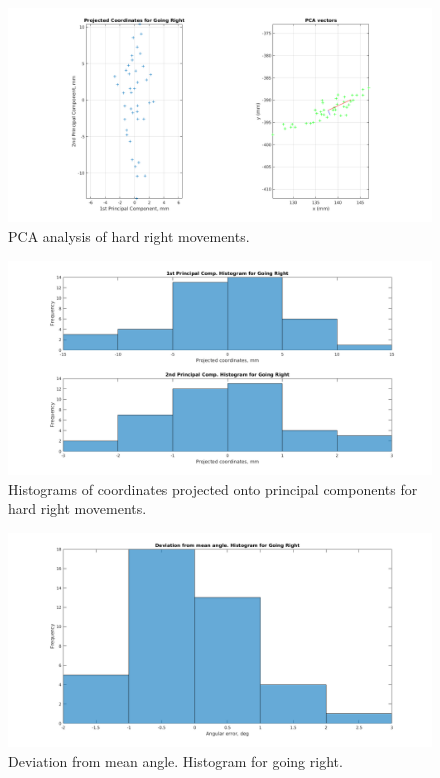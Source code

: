 \documentclass[paper=a4, fontsize=11pt]{scrartcl} %
\begin{document}
    \begin{figure}[H]
        \begin{center}
            \setlength{\fboxsep}{0.5pt} %
            \setlength{\fboxrule}{0.5pt}
            \includegraphics[width=\linewidth,fbox]{images/pca_Right.png}
            \caption{PCA analysis of hard right movements.}
        \end{center}
    \end{figure}
    
    \begin{figure}[H]
        \begin{center}
            \setlength{\fboxsep}{0.5pt} %
            \setlength{\fboxrule}{0.5pt}
            \includegraphics[width=\linewidth,fbox]{images/pca_histogram_Right.png}
            \caption{Histograms of coordinates projected onto principal components for hard right movements.}
        \end{center}
    \end{figure}

	\begin{figure}[H]
		\begin{center}
			\setlength{\fboxsep}{0.5pt} %
			\setlength{\fboxrule}{0.5pt}
			\includegraphics[width=\linewidth,fbox]{images/histogram_5_phi_right.png}
			\caption{Deviation from mean angle. Histogram for going right.}
		\end{center}
	\end{figure}
\end{document}
